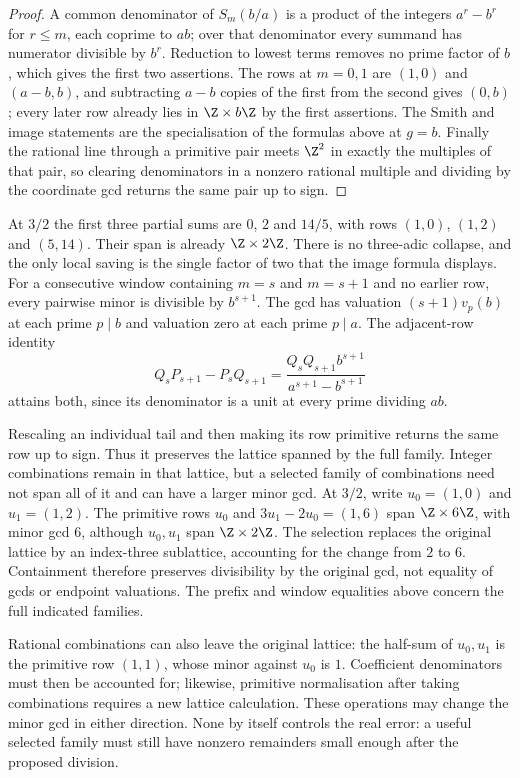 \begin{proof}
A common denominator of $S_m(b/a)$ is a product of the integers $a^r-b^r$ for
$r\le m$, each coprime to $ab$; over that denominator every summand has
numerator divisible by $b^r$. Reduction to lowest terms removes no prime factor
of $b$, which gives the first two assertions. The rows at $m=0,1$ are $(1,0)$
and $(a-b,b)$, and subtracting $a-b$ copies of the first from the second gives
$(0,b)$; every later row already lies in $\Z\times b\Z$ by the first
assertions. The Smith and image statements are the specialisation of the
formulas above at $g=b$. Finally the rational line through a primitive pair
meets $\Z^2$ in exactly the multiples of that pair, so clearing denominators in
a nonzero rational multiple and dividing by the coordinate gcd returns the same
pair up to sign.
\end{proof}

At $3/2$ the first three partial sums are $0$, $2$ and $14/5$, with rows
$(1,0)$, $(1,2)$ and $(5,14)$. Their span is already $\Z\times2\Z$. There is no
three-adic collapse, and the only local saving is the single factor of two that
the image formula displays. For a consecutive window containing $m=s$ and $m=s+1$ and no
earlier row, every pairwise minor is divisible by $b^{s+1}$.
The gcd has valuation $(s+1)v_p(b)$ at each prime $p\mid b$ and
valuation zero at each prime $p\mid a$. The adjacent-row identity
\[
 Q_sP_{s+1}-P_sQ_{s+1}
 =\frac{Q_sQ_{s+1}b^{s+1}}{a^{s+1}-b^{s+1}}
\]
attains both, since its denominator is a unit at every prime dividing $ab$.

Rescaling an individual tail and then making its row primitive
returns the same row up to sign. Thus it preserves the lattice
spanned by the full family. Integer combinations remain in that
lattice, but a selected family of combinations need not span all
of it and can have a larger minor gcd. At $3/2$, write
$u_0=(1,0)$ and $u_1=(1,2)$. The primitive rows $u_0$ and
$3u_1-2u_0=(1,6)$ span $\Z\times6\Z$, with minor gcd $6$,
although $u_0,u_1$ span $\Z\times2\Z$. The selection replaces the
original lattice by an index-three sublattice, accounting for the
change from $2$ to $6$. Containment therefore preserves divisibility
by the original gcd, not equality of gcds or endpoint valuations. The prefix and window equalities above
concern the full indicated families.

Rational combinations can also leave the original lattice: the
half-sum of $u_0,u_1$ is the primitive row $(1,1)$, whose minor
against $u_0$ is $1$. Coefficient denominators must then be accounted
for; likewise, primitive normalisation after taking combinations
requires a new lattice calculation. These operations may change
the minor gcd in either direction. None by itself controls the
real error: a useful selected family must still have nonzero
remainders small enough after the proposed division.



